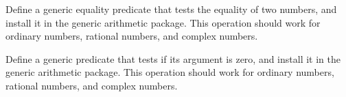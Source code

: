 \begin{exercise}
	\label{Exercise 2.79}
	Define a generic equality predicate  that tests the equality of two numbers, and install it in the generic arithmetic package.
	This operation should work for ordinary numbers, rational numbers, and complex numbers.
\end{exercise}



\begin{exercise}
	\label{Exercise 2.80}
	Define a generic predicate  that tests if its argument is zero, and install it in the generic arithmetic package.
	This operation should work for ordinary numbers, rational numbers, and complex numbers.
\end{exercise}
